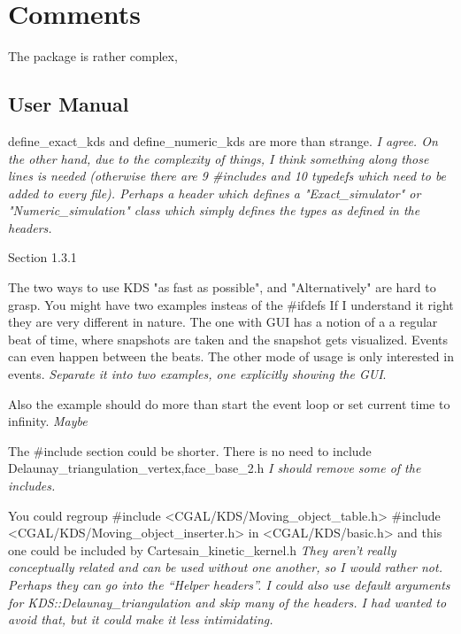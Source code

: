 \section{Comments}


The package is rather complex,


\subsection{User Manual}


define_exact_kds and define_numeric_kds are more than strange.
\textit{I agree. On the other hand, due to the complexity of things, I
think something along those lines is needed (otherwise there are 9
#includes and 10 typedefs which need to be added to every
file). Perhaps a header which defines a "Exact_simulator" or
"Numeric_simulation" class which simply defines the types as defined
in the headers.}






Section 1.3.1

The two ways to use KDS  "as fast as possible", and "Alternatively"
are hard to grasp. You might have two examples  insteas of the #ifdefs
If I understand it right they are very different in nature. The one
with GUI has a notion of a a regular beat of time, where snapshots
are taken and the snapshot gets visualized. Events can even happen
between the beats. The other mode of usage is only interested in
events.
\textit{Separate it into two examples, one explicitly showing the GUI}.


Also the example should do more than start the event loop  or
set current time to infinity.
\textit{Maybe}





The #include section could be shorter.
There is no need to include Delaunay_triangulation_{vertex,face}_base_2.h
\textit{I should remove some of the includes.}

You could regroup
#include <CGAL/KDS/Moving_object_table.h>
#include <CGAL/KDS/Moving_object_inserter.h>
in <CGAL/KDS/basic.h> and this one could
be included by Cartesain_kinetic_kernel.h
\textit{They aren't really conceptually related and can be used without one another, so I would rather not. Perhaps they can go into the ``Helper headers''. I could also use default arguments for KDS::Delaunay_triangulation and skip many of the headers. I had wanted to avoid that, but it could make it less intimidating.}


